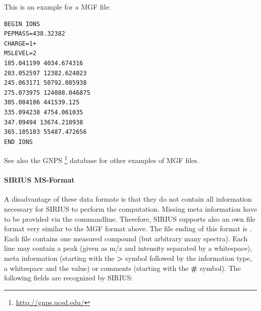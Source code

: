 \documentclass[letterpaper,10pt,openany,oneside]{sphinxmanual}
\begin{document}
This is an example for a MGF file:

\begin{Verbatim}[commandchars=\\\{\}]
BEGIN IONS
PEPMASS=438.32382
CHARGE=1+
MSLEVEL=2
185.041199 4034.674316
203.052597 12382.624023
245.063171 50792.085938
275.073975 124088.046875
305.084106 441539.125
335.094238 4754.061035
347.09494 13674.210938
365.105103 55487.472656
END IONS
\end{Verbatim}

See also the GNPS \footnote{\sphinxAtStartFootnote%
	\url{http://gnps.ucsd.edu/}
} database for other examples of MGF files.

\paragraph{SIRIUS MS-Format}
A disadvantage of these data formats is that they do not contain all information necessary for SIRIUS to perform the computation. Missing meta information have to be provided via the commandline. Therefore, SIRIUS supports also an own file format very similar to the MGF format above. The file ending of this format is . Each file contains one measured compound (but arbitrary many spectra). Each line may contain a peak (given as m/z and intensity separated by a whitespace), meta information (starting with the \textbf{\textgreater{}} symbol followed by the information type, a whitespace and the value) or comments (starting with the \textbf{\#} symbol). The following fields are recognized by SIRIUS:
\end{document}
